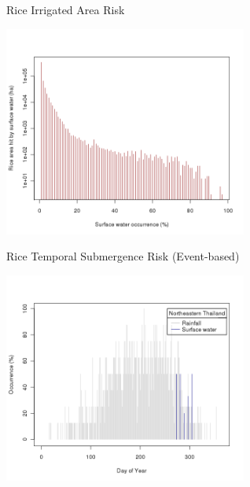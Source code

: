 \documentclass[xcolor=dvipsnames,beamer]{beamer} %
\begin{document}
\begin{frame}[fragile]{Rice Irrigated Area Risk}

\begin{center}
\includegraphics[width=8cm]{NETH_histogram_rice}
\end{center}

\end{frame}

\begin{frame}[fragile]{Rice Temporal Submergence Risk (Event-based)}

\begin{center}
\includegraphics[width=8cm]{NETH_daily}
\end{center}

\end{frame}
\end{document}

